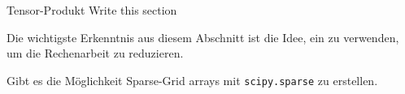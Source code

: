 \newpage

\begin{recall}[]{Tensor-Produkt}
    \TODO Write this section
\end{recall}

Die wichtigste Erkenntnis aus diesem Abschnitt ist die Idee, ein  zu verwenden, um die Rechenarbeit zu reduzieren.

\innumpy Gibt es die Möglichkeit Sparse-Grid arrays mit \texttt{scipy.sparse} zu erstellen.
